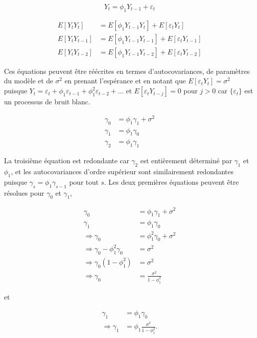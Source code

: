 \documentclass[
  letterpaper,
  DIV=11,
  numbers=noendperiod]{scrartcl}
\begin{document}
\[
Y_t = \phi_1 Y_{t-1} + \varepsilon_t
\]

\[
\begin{aligned}
E[Y_t Y_t] &= E[\phi_1 Y_{t-1} Y_t] + E[\varepsilon_t Y_t] \\
E[Y_t Y_{t-1}] &= E[\phi_1 Y_{t-1} Y_{t-1}] + E[\varepsilon_t Y_{t-1}] \\
E[Y_t Y_{t-2}] &= E[\phi_1 Y_{t-1} Y_{t-2}] + E[\varepsilon_t Y_{t-2}]
\end{aligned}
\]

Ces équations peuvent être réécrites en termes d'autocovariances, de
paramètres du modèle et de \(\sigma^2\) en prenant l'espérance et en
notant que \(E[\varepsilon_t Y_t] = \sigma^2\) puisque
\(Y_t = \varepsilon_t + \phi_1 \varepsilon_{t-1} + \phi_1^2 \varepsilon_{t-2} + \ldots\)
et \(E[\varepsilon_t Y_{t-j}] = 0\) pour \(j > 0\) car
\(\{\varepsilon_t\}\) est un processus de bruit blanc.

\[
\begin{aligned}
\gamma_0 &= \phi_1 \gamma_1 + \sigma^2 \\
\gamma_1 &= \phi_1 \gamma_0 \\
\gamma_2 &= \phi_1 \gamma_1
\end{aligned}
\]

La troisième équation est redondante car \(\gamma_2\) est entièrement
déterminé par \(\gamma_1\) et \(\phi_1\), et les autocovariances d'ordre
supérieur sont similairement redondantes puisque
\(\gamma_s = \phi_1 \gamma_{s-1}\) pour tout \(s\). Les deux premières
équations peuvent être résolues pour \(\gamma_0\) et \(\gamma_1\),

\[
\begin{aligned}
\gamma_0 &= \phi_1 \gamma_1 + \sigma^2 \\
\gamma_1 &= \phi_1 \gamma_0 \\
\Rightarrow \gamma_0 &= \phi_1^2 \gamma_0 + \sigma^2 \\
\Rightarrow \gamma_0 - \phi_1^2 \gamma_0 &= \sigma^2 \\
\Rightarrow \gamma_0 (1 - \phi_1^2) &= \sigma^2 \\
\Rightarrow \gamma_0 &= \frac{\sigma^2}{1 - \phi_1^2}
\end{aligned}
\]

et

\[
\begin{aligned}
\gamma_1 &= \phi_1 \gamma_0 \\
\Rightarrow \gamma_1 &= \phi_1 \frac{\sigma^2}{1 - \phi_1^2}.
\end{aligned}
\]
\end{document}
